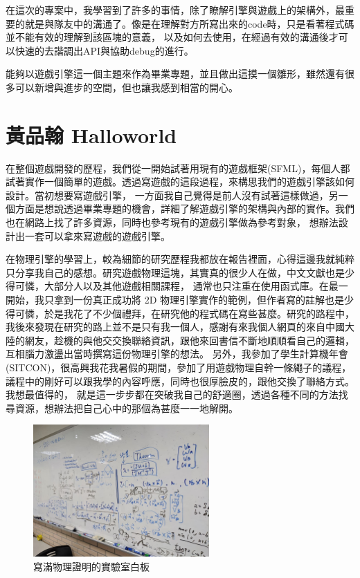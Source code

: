 在這次的專案中，我學習到了許多的事情，除了瞭解引擎與遊戲上的架構外，最重要的就是與隊友中的溝通了。像是在理解對方所寫出來的code時，只是看著程式碼並不能有效的理解到該區塊的意義，
以及如何去使用，在經過有效的溝通後才可以快速的去諧調出API與協助debug的進行。

能夠以遊戲引擎這一個主題來作為畢業專題，並且做出這摸一個雛形，雖然還有很多可以新增與進步的空間，但也讓我感到相當的開心。

\section{黃品翰 Halloworld}
\label{sec:Halloworld}

在整個遊戲開發的歷程，我們從一開始試著用現有的遊戲框架(SFML)，每個人都試著實作一個簡單的遊戲。透過寫遊戲的這段過程，來構思我們的遊戲引擎該如何設計。當初想要寫遊戲引擎，
一方面我自己覺得是前人沒有試著這樣做過，另一個方面是想說透過畢業專題的機會，詳細了解遊戲引擎的架構與內部的實作。我們也在網路上找了許多資源，同時也參考現有的遊戲引擎做為參考對象，
想辦法設計出一套可以拿來寫遊戲的遊戲引擎。

在物理引擎的學習上，較為細節的研究歷程我都放在報告裡面，心得這邊我就純粹只分享我自己的感想。研究遊戲物理這塊，其實真的很少人在做，中文文獻也是少得可憐，大部分人以及其他遊戲相關課程，
通常也只注重在使用函式庫。在最一開始，我只拿到一份真正成功將 2D 物理引擎實作的範例，但作者寫的註解也是少得可憐，於是我花了不少個禮拜，在研究他的程式碼在寫些甚麼。研究的路程中，
我後來發現在研究的路上並不是只有我一個人，感謝有來我個人網頁的來自中國大陸的網友，趁機的與他交交換聯絡資訊，跟他來回書信不斷地順順看自己的邏輯，互相腦力激盪出當時撰寫這份物理引擎的想法。
另外，我參加了學生計算機年會(SITCON)，很高興我花我暑假的期間，參加了用遊戲物理自幹一條繩子的議程，議程中的剛好可以跟我學的內容呼應，同時也很厚臉皮的，跟他交換了聯絡方式。我想最值得的，
就是這一步步都在突破我自己的舒適圈，透過各種不同的方法找尋資源，想辦法把自己心中的那個為甚麼一一地解開。

\begin{figure}[h]
    \begin{center}
    \includegraphics[width=0.6\textwidth]{./resources/ch6/halloworld_1.jpg}
    \end{center}
\caption{寫滿物理證明的實驗室白板}
\label{fig:ch6_whiteboard}
\end{figure}

